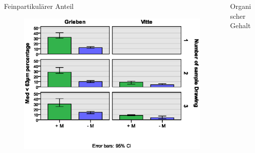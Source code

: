 \documentclass{beamer}
\begin{document}
\begin{frame}
\begin{columns}
\begin{column}{5.5cm}
Feinpartikulärer Anteil
\begin{figure}
\includegraphics[width=\textwidth]{images/sedimentparameter/S_Parameter_63_neu1.eps}
\end{figure}
\end{column}
\begin{column}{5.5cm}
\pause
Organischer Gehalt
\end{column}
\end{columns}
\end{frame}
\end{document}

